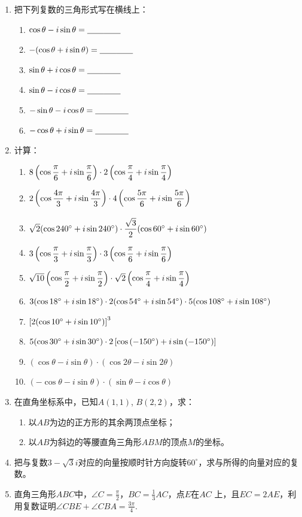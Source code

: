 \begin{enumerate}
    \item 把下列复数的三角形式写在横线上：
\begin{enumerate}[(1)]
    \item $\cos\theta-i\sin\theta = \underline{\qquad}\underline{\qquad}$
    \item $-(\cos\theta+i\sin\theta) = \underline{\qquad}\underline{\qquad}$
    \item $\sin\theta+i\cos\theta = \underline{\qquad}\underline{\qquad}$
    \item $\sin\theta-i\cos\theta = \underline{\qquad}\underline{\qquad}$
    \item $-\sin\theta-i\cos\theta = \underline{\qquad}\underline{\qquad}$
    \item $-\cos\theta+i\sin\theta = \underline{\qquad}\underline{\qquad}$
\end{enumerate}
    \item 计算：
\begin{enumerate}[(1)]
    \item $8\left(\cos\dfrac{\pi}{6}+i\sin\dfrac{\pi}{6}\right)\cdot 2\left(\cos\dfrac{\pi}{4}+i\sin\dfrac{\pi}{4}\right)$
    \item $2\left(\cos\dfrac{4\pi}{3}+i\sin\dfrac{4\pi}{3}\right)\cdot 4\left(\cos\dfrac{5\pi}{6}+i\sin\dfrac{5\pi}{6}\right)$
    \item $\sqrt{2}(\cos240^{\circ}+i\sin240^{\circ})\cdot \dfrac{\sqrt{3}}{2}(\cos60^{\circ}+i\sin60^{\circ})$
    \item $3\left(\cos\dfrac{\pi}{3}+i\sin\dfrac{\pi}{3}\right)\cdot 3\left(\cos\dfrac{\pi}{6}+i\sin\dfrac{\pi}{6}\right)$
    \item $\sqrt{10}\left(\cos\dfrac{\pi}{2}+i\sin\dfrac{\pi}{2}\right)\cdot \sqrt{2}\left(\cos\dfrac{\pi}{4}+i\sin\dfrac{\pi}{4}\right)$
    \item $3(\cos18^{\circ}+i\sin18^{\circ})\cdot 2(\cos54^{\circ}+i\sin54^{\circ})\cdot 5(\cos108^{\circ}+i\sin108^{\circ})$
    \item $\left[2(\cos10^{\circ}+i\sin10^{\circ})\right]^3$
    \item $5(\cos30^{\circ}+i\sin30^{\circ})\cdot 2\left[\cos\left(-150^{\circ}\right)+i\sin\left(-150^{\circ}\right)\right]$
    \item $(\cos\theta-i\sin\theta)\cdot (\cos2\theta-i\sin2\theta)$
    \item $(-\cos\theta-i\sin\theta)\cdot (\sin\theta-i\cos\theta)$
\end{enumerate}
    \item 在直角坐标系中，已知$A(1,1)$, $B(2,2)$，求：
\begin{enumerate}[(1)]
\item 以$AB$为边的正方形的其余两顶点坐标；
\item 以$AB$为斜边的等腰直角三角形$ABM$的顶点$M$的坐标。 
\end{enumerate}
\item 
把与复数$3-\sqrt{3}i$对应的向量按顺时针方向旋转$60^{\circ}$，求与所得的向量对应的复数。
\item 直角三角形$ABC$中，$\angle C=\frac{\pi}{2}$，$BC=\frac{1}{3}AC$，点$E$在$AC$
上，且$EC=2AE$，利用复数证明$\angle CBE+\angle CBA=\frac{3\pi}{4}$.


\end{enumerate}
